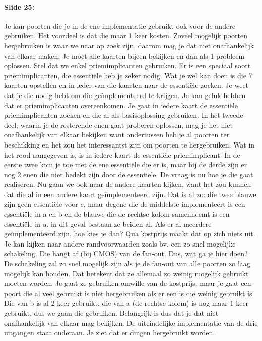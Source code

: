 \documentclass[10pt,a4paper]{book}
\begin{document}
\paragraph{Slide 25:} Je kan poorten die je in de ene implementatie gebruikt ook voor de andere gebruiken. Het voordeel is dat die maar 1 keer kosten. Zoveel mogelijk poorten hergebruiken is waar we naar op zoek zijn, daarom mag je dat niet onafhankelijk van elkaar maken. Je moet alle kaarten bijeen bekijken en dan als 1 probleem oplossen. Stel dat we enkel priemimplicanten gebruiken. Er is een speciaal soort priemimplicanten, die essenti\"ele heb je zeker nodig. Wat je wel kan doen is die 7 kaarten opstellen en in ieder van die kaarten naar de essenti\"ele zoeken. Je weet dat je die nodig hebt om die ge\"implementeerd te krijgen. Je kan geluk hebben dat er priemimplicanten overeenkomen. Je gaat in iedere kaart de essenti\"ele priemimplicanten zoeken en die al als basisoplossing gebruiken. In het tweede deel, waarin je de resterende enen gaat proberen oplossen, mag je het niet onafhankelijk van elkaar bekijken want ondertussen heb je al poorten ter beschikking en het zou het interessantst zijn om poorten te hergebruiken. Wat in het rood aangegeven is, is in iedere kaart de essenti\"ele priemimplicant. In de eerste twee kom je toe met de ene essenti\"ele die er is, maar bij de derde zijn er nog 2 enen die niet bedekt zijn door de essenti\"ele. De vraag is nu hoe je die gaat realiseren. Nu gaan we ook naar de andere kaarten kijken, want het zou kunnen dat die al in een andere kaart ge\"implementeerd zijn. Dat is al zo: die twee blauwe zijn geen essenti\"ele voor c, maar degene die de middelste implementeert is een essenti\"ele in a en b en de blauwe die de rechtse kolom samenneemt is een essenti\"ele in a. in dit geval bestaan ze beiden al. Als er al meerdere ge\"implementeerd zijn, hoe kies je dan? Qua kostprijs maakt dat op zich niets uit. Je kan kijken naar andere randvoorwaarden zoals bv. een zo snel mogelijke schakeling. Die hangt af (bij CMOS) van de fan-out. Dus, wat ga je hier doen? De schakeling zal zo snel mogelijk zijn als je de fan-out van alle poorten zo laag mogelijk kan houden. Dat betekent dat ze allemaal zo weinig mogelijk gebruikt moeten worden. Je gaat ze gebruiken omwille van de kostprijs, maar je gaat een poort die al veel gebruikt is niet hergebruiken als er een is die weinig gebruikt is. Die van b is al 2 keer gebruikt, die van a (de rechtse kolom) is nog maar 1 keer gebruikt, dus we gaan die gebruiken. Belangrijk is dus dat je dat niet onafhankelijk van elkaar mag bekijken. De uiteindelijke implementatie van de drie uitgangen staat onderaan. Je ziet dat er dingen hergebruikt worden. 
\end{document}
